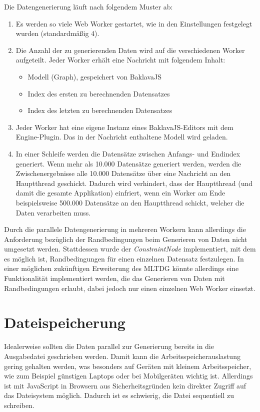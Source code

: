Die Datengenerierung läuft nach folgendem Muster ab:

\begin{enumerate}
    \item Es werden so viele Web Worker gestartet, wie in den Einstellungen festgelegt wurden (standardmäßig 4).
    \item Die Anzahl der zu generierenden Daten wird auf die verschiedenen Worker aufgeteilt. Jeder Worker erhält eine Nachricht mit folgendem Inhalt:
    \begin{itemize}
        \item Modell (Graph), gespeichert von BaklavaJS
        \item Index des ersten zu berechnenden Datensatzes
        \item Index des letzten zu berechnenden Datensatzes
    \end{itemize}
    \item Jeder Worker hat eine eigene Instanz eines BaklavaJS-Editors mit dem Engine-Plugin. Das in der Nachricht enthaltene Modell wird geladen.
    \item In einer Schleife werden die Datensätze zwischen Anfangs- und Endindex generiert. Wenn mehr als 10.000 Datensätze generiert werden, werden die Zwischenergebnisse alle 10.000 Datensätze über eine Nachricht an den Hauptthread geschickt. Dadurch wird verhindert, dass der Hauptthread (und damit die gesamte Applikation) einfriert, wenn ein Worker am Ende beispielsweise 500.000 Datensätze an den Hauptthread schickt, welcher die Daten verarbeiten muss.
\end{enumerate}

Durch die parallele Datengenerierung in mehreren Workern kann allerdings die Anforderung bezüglich der Randbedingungen beim Generieren von Daten nicht umgesetzt werden. Stattdessen wurde der \textit{ConstraintNode} implementiert, mit dem es möglich ist, Randbedingungen für einen einzelnen Datensatz festzulegen. In einer möglichen zukünftigen Erweiterung des \ac{MLTDG} könnte allerdings eine Funktionalität implementiert werden, die das Generieren von Daten mit Randbedingungen erlaubt, dabei jedoch nur einen einzelnen Web Worker einsetzt.

\section{Dateispeicherung}

Idealerweise sollten die Daten parallel zur Generierung bereits in die Ausgabedatei geschrieben werden. Damit kann die Arbeitsspeicherauslastung gering gehalten werden, was besonders auf Geräten mit kleinem Arbeitsspeicher, wie zum Beispiel günstigen Laptops oder bei Mobilgeräten wichtig ist. Allerdings ist mit JavaScript in Browsern aus Sicherheitsgründen kein direkter Zugriff auf das Dateisystem möglich. Dadurch ist es schwierig, die Datei sequentiell zu schreiben.

